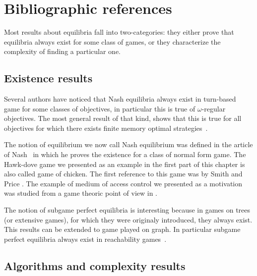 \section*{Bibliographic references}\label{other-results}




Most results about equilibria fall into two-categories: they either prove
that equilibria always exist for some class of games, or they characterize
the complexity of finding a particular one.


\subsection*{Existence results}
Several authors have noticed that Nash equilibria always exist in turn-based
game for some classes of objectives, in particular this is true of
$\omega$-regular objectives.
The most general result of that kind, shows that this is true for all objectives
for which there exists finite memory optimal strategies~\cite{LeRoux&Pauly:2018}.

The notion of equilibrium we now call Nash equilibrium was
defined in the article of Nash~\cite{Nash:1950} in which he proves the
existence for a class of normal form game.
The Hawk-dove game we presented as an example in the first part of
this chapter is also called game of chicken.
The first reference to this game was by Smith and Price \cite{Smith&Price:1973}.
The example of medium of access control we presented as a motivation was
studied from a game theoric point of view in \cite{MacKenzie&Wicker:2003}.

The notion of subgame perfect equilibria is interesting because in games on
trees (or extensive games), for which they were originaly introduced, they
always exist. This results can be extended to game played on graph.
In particular subgame perfect equilibria always exist in reachability
games~\cite{Brihaye&Bruyere&DePril&Gimbert:2012}.

\subsection*{Algorithms and complexity results}

